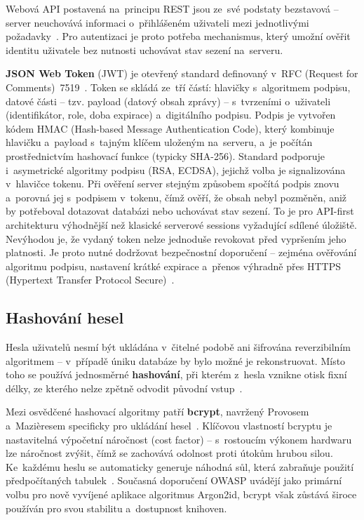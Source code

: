 Webová API postavená na~principu REST jsou ze~své podstaty bezstavová -- server neuchovává informaci o~přihlášeném uživateli mezi jednotlivými požadavky~\cite{fielding2000rest}. Pro autentizaci je proto potřeba mechanismus, který umožní ověřit identitu uživatele bez nutnosti uchovávat stav sezení na~serveru.

\textbf{JSON Web Token} (JWT) je otevřený standard definovaný v~RFC (Request for Comments)~7519~\cite{rfc7519jwt}. Token se skládá ze~tří částí: hlavičky s~algoritmem podpisu, datové části -- tzv. payload (datový obsah zprávy) -- s~tvrzeními o~uživateli (identifikátor, role, doba expirace) a~digitálního podpisu. Podpis je vytvořen kódem HMAC (Hash-based Message Authentication Code), který kombinuje hlavičku a~payload s~tajným klíčem uloženým na~serveru, a~je počítán prostřednictvím hashovací funkce (typicky SHA-256). Standard podporuje i~asymetrické algoritmy podpisu (RSA, ECDSA), jejichž volba je signalizována v~hlavičce tokenu. Při ověření server stejným způsobem spočítá podpis znovu a~porovná jej s~podpisem v~tokenu, čímž ověří, že obsah nebyl pozměněn, aniž by potřeboval dotazovat databázi nebo uchovávat stav sezení. To je pro API-first architekturu výhodnější než klasické serverové sessions vyžadující sdílené úložiště. Nevýhodou je, že vydaný token nelze jednoduše revokovat před vypršením jeho platnosti. Je proto nutné dodržovat bezpečnostní doporučení -- zejména ověřování algoritmu podpisu, nastavení krátké expirace a~přenos výhradně přes HTTPS (Hypertext Transfer Protocol Secure)~\cite{rfc8725jwt}.

\subsection{Hashování hesel}

Hesla uživatelů nesmí být ukládána v~čitelné podobě ani šifrována reverzibilním algoritmem -- v~případě úniku databáze by bylo možné je rekonstruovat. Místo toho se používá jednosměrné \textbf{hashování}, při kterém z~hesla vznikne otisk fixní délky, ze kterého nelze zpětně odvodit původní vstup~\cite{owasp2024password}.

Mezi osvědčené hashovací algoritmy patří \textbf{bcrypt}, navržený Provosem a~Mazièresem specificky pro ukládání hesel~\cite{provos1999bcrypt}. Klíčovou vlastností bcryptu je nastavitelná výpočetní náročnost (cost factor) -- s~rostoucím výkonem hardwaru lze náročnost zvýšit, čímž se zachovává odolnost proti útokům hrubou silou. Ke~každému heslu se automaticky generuje náhodná sůl, která zabraňuje použití předpočítaných tabulek~\cite{owasp2024password}. Současná doporučení OWASP uvádějí jako primární volbu pro nově vyvíjené aplikace algoritmus Argon2id, bcrypt však zůstává široce používán pro svou stabilitu a~dostupnost knihoven.

